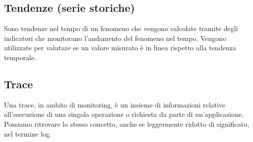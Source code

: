 	\subsection*{Tendenze (serie storiche)}	

		Sono tendenze nel tempo di un fenomeno che vengono calcolate tramite degli indicatori che monitorano l'andamento del fenomeno nel tempo. Vengono utilizzate per valutare se un valore misurato è in linea rispetto alla tendenza temporale.
	
	\subsection*{Trace}

        Una trace, in ambito di monitoring, è un insieme di informazioni relative all'esecuzione di una singola operazione
        o richiesta da parte di un'applicazione.
        Possiamo ritrovare lo stesso concetto, anche se leggermente ridotto di significato, nel termine log.
        
